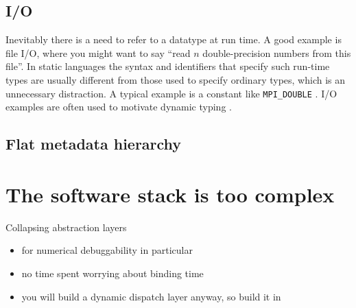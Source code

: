{%




\subsection{I/O}

Inevitably there is a need to refer to a datatype at run time.
A good example is file I/O, where you might want to say ``read $n$ double-precision
numbers from this file''.
In static languages the syntax and identifiers that
specify such run-time types are usually different from those used to specify
ordinary types, which is an unnecessary distraction.
A typical example is a constant like \texttt{MPI\_DOUBLE} \cite{snir1998mpi}.
I/O examples are often used to motivate dynamic typing \cite{Abadi:1991:DTS:103135.103138}.


\subsection{Flat metadata hierarchy}




\section{The software stack is too complex}

Collapsing abstraction layers

\begin{itemize}
\item for numerical debuggability in particular
\item no time spent worrying about binding time
\item you will build a dynamic dispatch layer anyway, so build it in
\end{itemize}

}
